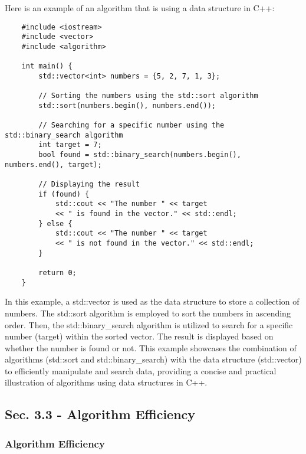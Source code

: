 \begin{solution}
    Here is an example of an algorithm that is using a data structure in C++: \\
    \horizontalline
    \begin{verbatim}
    #include <iostream>
    #include <vector>
    #include <algorithm>
    
    int main() {
        std::vector<int> numbers = {5, 2, 7, 1, 3};
        
        // Sorting the numbers using the std::sort algorithm
        std::sort(numbers.begin(), numbers.end());
        
        // Searching for a specific number using the std::binary_search algorithm
        int target = 7;
        bool found = std::binary_search(numbers.begin(), numbers.end(), target);
        
        // Displaying the result
        if (found) {
            std::cout << "The number " << target 
            << " is found in the vector." << std::endl;
        } else {
            std::cout << "The number " << target 
            << " is not found in the vector." << std::endl;
        }
        
        return 0;
    }        
    \end{verbatim}
    
    \horizontalline

    \noindent In this example, a std::vector is used as the data structure to store a collection of numbers. The std::sort algorithm is employed to sort the numbers in ascending order. Then, the std::binary\_search algorithm is utilized to search for a specific number (target) within the sorted vector. The result is displayed based on whether the number is found or not. This example showcases the combination of algorithms 
    (std::sort and std::binary\_search) with the data structure (std::vector) to efficiently manipulate and search data, providing a concise and practical illustration of algorithms using data structures in C++.
\end{solution}

\subsection*{Sec. 3.3 - Algorithm Efficiency}
\subsubsection*{Algorithm Efficiency}

